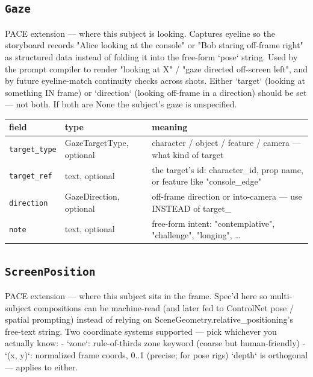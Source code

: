 \subsection*{\texttt{Gaze}}
\noindent PACE extension ---\allowbreak{} where this subject is looking. Captures eyeline so the storyboard records "Alice looking at the console" or "Bob staring off-frame right" as structured data instead of folding it into the free-form `pose` string. Used by the prompt compiler to render "looking at X" /\allowbreak{} "gaze directed off-screen left", and by future eyeline-match continuity checks across shots. Either `target` (looking at something IN frame) or `direction` (looking off-frame in a direction) should be set ---\allowbreak{} not both. If both are None the subject's gaze is unspecified.

\begin{longtable}{@{}R{0.24\textwidth}R{0.21\textwidth}R{0.49\textwidth}@{}}
\toprule \textbf{field} & \textbf{type} & \textbf{meaning} \\ \midrule
\endhead
\texttt{target\_\allowbreak type} & GazeTargetType, optional & character /\allowbreak{} object /\allowbreak{} feature /\allowbreak{} camera ---\allowbreak{} what kind of target \\
\texttt{target\_\allowbreak ref} & text, optional & the target's id: character\_\allowbreak id, prop name, or feature like "console\_\allowbreak edge" \\
\texttt{direction} & GazeDirection, optional & off-frame direction or into-camera ---\allowbreak{} use INSTEAD of target\_\allowbreak * \\
\texttt{note} & text, optional & free-form intent: "contemplative", "challenge", "longing", \ldots{} \\
\bottomrule
\end{longtable}

\subsection*{\texttt{ScreenPosition}}
\noindent PACE extension ---\allowbreak{} where this subject sits in the frame. Spec'd here so multi-subject compositions can be machine-read (and later fed to ControlNet pose /\allowbreak{} spatial prompting) instead of relying on SceneGeometry.relative\_\allowbreak positioning's free-text string. Two coordinate systems supported ---\allowbreak{} pick whichever you actually know: - `zone`: rule-of-thirds zone keyword (coarse but human-friendly) - `(x, y)`: normalized frame coords, 0..1 (precise; for pose rigs) `depth` is orthogonal ---\allowbreak{} applies to either.

